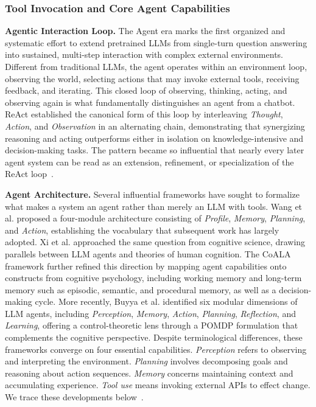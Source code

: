 \subsubsection{Tool Invocation and Core Agent Capabilities}

\textbf{Agentic Interaction Loop.} The Agent era marks the first organized and systematic effort to extend pretrained LLMs from single-turn question answering into sustained, multi-step interaction with complex external environments. Different from traditional LLMs, the agent operates within an environment loop, observing the world, selecting actions that may invoke external tools, receiving feedback, and iterating. This closed loop of observing, thinking, acting, and observing again is what fundamentally distinguishes an agent from a chatbot. ReAct \cite{yao2022react} established the canonical form of this loop by interleaving \emph{Thought}, \emph{Action}, and \emph{Observation} in an alternating chain, demonstrating that synergizing reasoning and acting outperforms either in isolation on knowledge-intensive and decision-making tasks. The pattern became so influential that nearly every later agent system can be read as an extension, refinement, or specialization of the ReAct loop~\citep{ruan2023tptu,lee2026survey,shen2024llm,li2024survey,NEURIPS2025_48dcc43a}.

\textbf{Agent Architecture.} Several influential frameworks have sought to formalize what makes a system an agent rather than merely an LLM with tools. Wang et al. \cite{wang2024survey} proposed a four-module architecture consisting of \emph{Profile}, \emph{Memory}, \emph{Planning}, and \emph{Action}, establishing the vocabulary that subsequent work has largely adopted. Xi et al. \cite{xi2023rise} approached the same question from cognitive science, drawing parallels between LLM agents and theories of human cognition. The CoALA framework \cite{sumers2023cognitive} further refined this direction by mapping agent capabilities onto constructs from cognitive psychology, including working memory and long-term memory such as episodic, semantic, and procedural memory, as well as a decision-making cycle. More recently, Buyya et al. \cite{buyya2026agentic} identified six modular dimensions of LLM agents, including \emph{Perception}, \emph{Memory}, \emph{Action}, \emph{Planning}, \emph{Reflection}, and \emph{Learning}, offering a control-theoretic lens through a POMDP formulation that complements the cognitive perspective. Despite terminological differences, these frameworks converge on four essential capabilities. \emph{Perception} refers to observing and interpreting the environment. \emph{Planning} involves decomposing goals and reasoning about action sequences. \emph{Memory} concerns maintaining context and accumulating experience. \emph{Tool use} means invoking external APIs to effect change. We trace these developments below~\citep{li2025review,xu2026evolution,xi2026toolgym,chezelles2024browsergym,kruppweb,wu2026omniflowphysicsgroundedmultimodalagent,11356944,ICLR2024_d53538ba,dong2026deep}.

